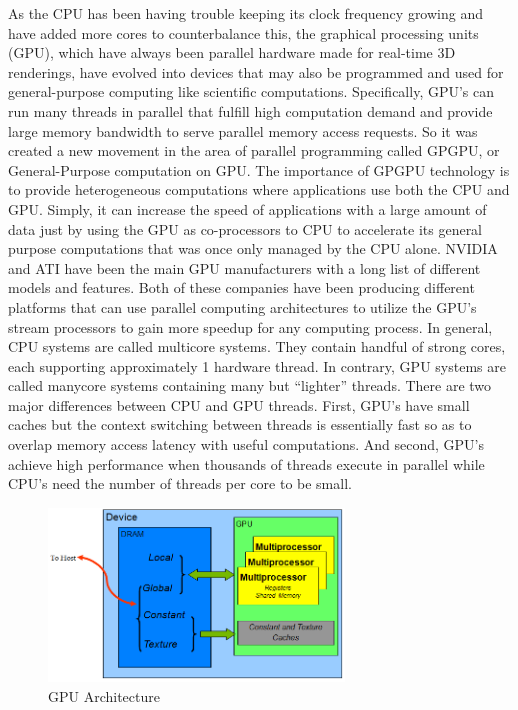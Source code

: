 As the CPU has been having trouble keeping its clock frequency growing and have added more cores to counterbalance this, the graphical processing units (GPU), which have always been parallel hardware made for real-time 3D renderings, have evolved into devices that may also be programmed and used for general-purpose computing like scientific computations. Specifically, GPU’s can run many threads in parallel that fulfill high computation demand and provide large memory bandwidth to serve parallel memory access requests.
So it was created a new movement in the area of parallel programming called GPGPU, or General-Purpose computation on GPU. The importance of GPGPU technology is to provide heterogeneous computations where applications use both the CPU and GPU. Simply, it can increase the speed of applications with a large amount of data just by using the GPU as co-processors to CPU to accelerate its general purpose computations that was once only managed by the CPU alone. NVIDIA and ATI have been the main GPU manufacturers with a long list of different models and features. Both of these companies have been producing different platforms that can use parallel computing architectures to utilize the GPU’s stream processors to gain more speedup for any computing process. 
In general, CPU systems are called multicore systems. They contain handful of strong cores, each supporting approximately 1 hardware thread. In contrary, GPU systems are called manycore systems containing many but “lighter” threads. There are two major differences between CPU and GPU threads. First, GPU’s have small caches but the context switching between threads is essentially fast so as to overlap memory access latency with useful computations. And second, GPU’s achieve high performance when thousands of threads execute in parallel while CPU’s need the number of threads per core to be small. 
 \begin{figure}[H]
    \centering
        \includegraphics[totalheight=0.5\textheight,width=0.7\textwidth]{GPU.png}
    \caption{GPU Architecture}
    \label{fig:GPU}
\end{figure}

